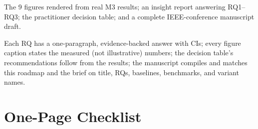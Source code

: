 \documentclass[11pt]{article}
\begin{document}
\begin{delivbox}
The 9 figures rendered from real M3 results; an insight report answering RQ1--RQ3; the
practitioner decision table; and a complete IEEE-conference manuscript draft.
\end{delivbox}
\begin{checkbox}
Each RQ has a one-paragraph, evidence-backed answer with CIs; every figure caption
states the measured (not illustrative) numbers; the decision table's recommendations
follow from the results; the manuscript compiles and matches this roadmap and the brief
on title, RQs, baselines, benchmarks, and variant names.
\end{checkbox}

\section{One-Page Checklist}
\end{document}
